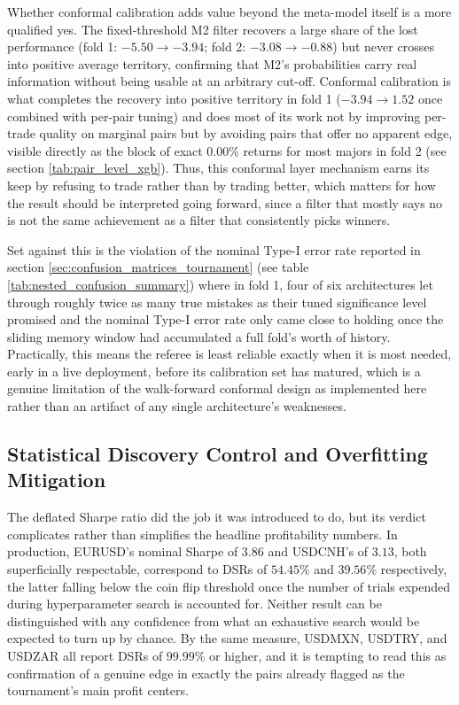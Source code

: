 \documentclass[12pt, a4paper]{article}
\begin{document}
Whether conformal calibration adds value beyond the meta-model itself is a more qualified yes. The fixed-threshold M2 filter recovers a large share of the lost performance 
(fold 1: $-5.50 \to -3.94$; fold 2: $-3.08 \to -0.88$) but never crosses into positive average territory, confirming that M2's probabilities carry real information without being 
usable at an arbitrary cut-off. Conformal calibration is what completes the recovery into positive territory in fold 1 ($-3.94 \to 1.52$ once combined with per-pair tuning) and 
does most of its work not by improving per-trade quality on marginal pairs but by avoiding pairs that offer no apparent edge, visible directly as the block of exact 
$0.00\%$ returns for most majors in fold 2 (see section \ref{tab:pair_level_xgb}). Thus, this conformal layer mechanism earns its keep by refusing to trade rather than by trading 
better, which matters for how the result should be interpreted going forward, since a filter that mostly says no is not the same achievement as a filter that consistently picks winners.

\medskip

Set against this is the violation of the nominal Type-I error rate reported in section \ref{sec:confusion_matrices_tournament} (see table \ref{tab:nested_confusion_summary}) where in fold 1, 
four of six architectures let through roughly twice as many true mistakes as their tuned significance level promised and the nominal Type-I error rate only came close to holding once the 
sliding memory window had accumulated a full fold's worth of history. Practically, this means the referee is least reliable exactly when it is most needed, early in a live deployment, 
before its calibration set has matured, which is a genuine limitation of the walk-forward conformal design as implemented here rather than an artifact of any single architecture's 
weaknesses.


\subsection{Statistical Discovery Control and Overfitting Mitigation}

The deflated Sharpe ratio did the job it was introduced to do, but its verdict complicates rather than simplifies the headline profitability numbers. In production, EURUSD's 
nominal Sharpe of $3.86$ and USDCNH's of $3.13$, both superficially respectable, correspond to DSRs of $54.45\%$ and $39.56\%$ respectively, the latter falling below the 
coin flip threshold once the number of trials expended during hyperparameter search is accounted for. Neither result can be distinguished with any confidence from what an 
exhaustive search would be expected to turn up by chance. By the same measure, USDMXN, USDTRY, and USDZAR all report DSRs of $99.99\%$ or higher, and it is tempting to read this 
as confirmation of a genuine edge in exactly the pairs already flagged as the tournament's main profit centers.
\end{document}
